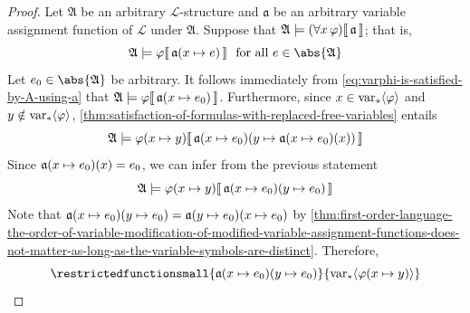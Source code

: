 \begin{proof}
    Let \( \mathfrak{A} \) be an arbitrary \( \mathcal{L} \)-structure and \( \mathfrak{a} \) be an arbitrary variable assignment function of \( \mathcal{L} \) under
    \( \mathfrak{A} \). Suppose that \( \folwffsatisfaction{\mathfrak{A}}{ \mleft( \forall x \, \varphi \mright) }{\mathfrak{a}} \); that is,
    \begin{equation}
        \label{eq:varphi-is-satisfied-by-A-using-a}
        \folwffsatisfaction{\mathfrak{A}}{\varphi}{ \folmodifiedvariableassignmentfunction{\mathfrak{a}}{x}{e} }
        \ \ \text{for all} \ e \in \abs{\mathfrak{A}}
    \end{equation}
    Let \( e_{0} \in \abs{\mathfrak{A}} \) be arbitrary. It follows immediately from \eqref{eq:varphi-is-satisfied-by-A-using-a} that
    \( \folwffsatisfaction{\mathfrak{A}}{\varphi}{ \folmodifiedvariableassignmentfunction{\mathfrak{a}}{x}{e_{0}} } \).
    Furthermore, since \( x \in \operatorname{var}_{\ast} \langle\varphi\rangle \) and \( y \notin \operatorname{var}_{\ast} \langle\varphi\rangle \), \cref{thm:satisfaction-of-formulas-with-replaced-free-variables} entails
    \begin{equation*}
        \folwffsatisfaction{\mathfrak{A}}{ \folfreevariablereplacement{\varphi}{x}{y} }{ \folmodifiedvariableassignmentfunction{ \folmodifiedvariableassignmentfunction{\mathfrak{a}}{x}{e_{0}} }{y}{ \folmodifiedvariableassignmentfunction{\mathfrak{a}}{x}{e_{0}}(x) } }
    \end{equation*}
    Since \( \folmodifiedvariableassignmentfunction{\mathfrak{a}}{x}{e_{0}}(x) = e_{0} \), we can infer from the previous statement
    \begin{equation*}
        \folwffsatisfaction{\mathfrak{A}}{ \folfreevariablereplacement{\varphi}{x}{y} }{ \folmodifiedvariableassignmentfunction{ \folmodifiedvariableassignmentfunction{\mathfrak{a}}{x}{e_{0}} }{y}{ e_{0} } }
    \end{equation*}
    Note that \(  \folmodifiedvariableassignmentfunction{ \folmodifiedvariableassignmentfunction{\mathfrak{a}}{x}{e_{0}} }{y}{e_{0}} = \folmodifiedvariableassignmentfunction{ \folmodifiedvariableassignmentfunction{\mathfrak{a}}{y}{e_{0}} }{x}{e_{0}}\)
    by \cref{thm:first-order-language-the-order-of-variable-modification-of-modified-variable-assignment-functions-does-not-matter-as-long-as-the-variable-symbols-are-distinct}.
    Therefore,
    \begin{equation*}
        \restrictedfunctionsmall{ \folmodifiedvariableassignmentfunction{ \folmodifiedvariableassignmentfunction{\mathfrak{a}}{x}{e_{0}} }{y}{e_{0}}  }{ \folfreevars{ \folfreevariablereplacement{\varphi}{x}{y} } }

\end{equation*}
\end{proof}
